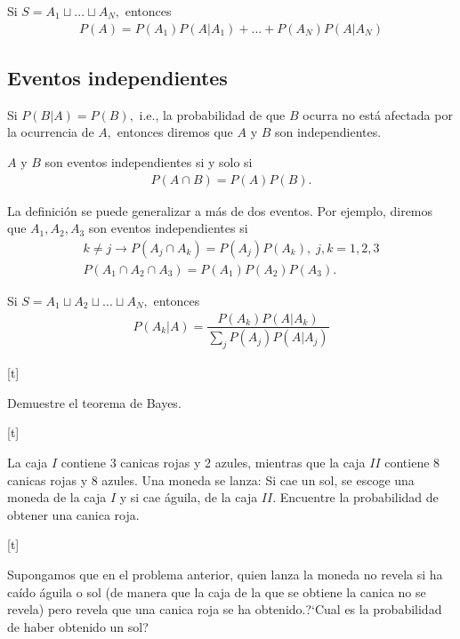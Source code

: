 {}
\begin{thm}
 \label{thm:1.10} Si $S=A_{1}\sqcup ... \sqcup A_{N},$  entonces
 \begin{align}
\label{1.20}
P(A)=P(A_{1})P(A|A_{1})+...+P(A_{N})P(A|A_{N})
\end{align}
\end{thm}


\subsection{Eventos independientes}
{}
Si $P(B|A)=P(B),$ i.e., la probabilidad de que $B$ ocurra no está afectada por la ocurrencia de $A,$ entonces diremos que $A$ y $B$ son independientes.


\begin{defn}
 $A$ y $B$ son eventos independientes si y solo si
 \begin{align}
  \label{1.21}
  P(A \cap B) = P(A)P(B).
 \end{align}
\end{defn}


{}
La definición se puede generalizar a más de dos eventos.  Por ejemplo, diremos que $A_{1},A_{2},A_{3}$ son eventos independientes si
\begin{align}
k\neq j \rightarrow P(A_{j} \cap A_{k})=P(A_{j})P(A_{k}), \; j,k=1,2,3 
\\ P(A_{1}\cap A_{2} \cap A_{3})=P(A_{1})P(A_{2})P(A_{3}).
\end{align}


{}
\begin{thm}
 Si $S=A_{1}\sqcup A_{2} \sqcup...\sqcup A_{N},$ entonces
 \begin{align}
  \label{1.24}
  P(A_{k}|A) = \dfrac{P(A_{k})P(A|A_{k})}{\sum_{j} P(A_{j})P(A|A_{j})}
 \end{align}

\end{thm}



[t]
 \begin{exmp}
  \label{solved:1.16}
  Demuestre el teorema de Bayes.
 \end{exmp}



[t]{}
 \begin{exmp}
  \label{solved:1.15}
 La caja $I$ contiene 3 canicas rojas y 2 azules, mientras que la caja $II$ contiene $8$ canicas rojas y 8 azules. Una moneda se lanza: Si cae un sol, se escoge una moneda de la caja $I$ y si cae águila, de la caja $II.$ Encuentre la probabilidad de obtener una canica roja.
 \end{exmp}


[t]{}
 \begin{exmp}
  \label{solved:17}
	Supongamos que en el problema anterior, quien lanza la moneda no revela si ha caído águila o sol (de manera que la caja de la que se obtiene la canica no se revela) pero revela que una canica roja se ha obtenido.?`Cual es la probabilidad de haber obtenido un sol?
 \end{exmp}



